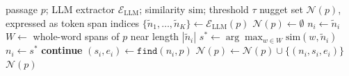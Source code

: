 \begin{algorithm}[htbp]
\caption{Nugget extraction pipeline.}
\label{alg:nugget}
\footnotesize
\begin{algorithmic}[1]
\Require passage $p$; LLM extractor $\mathcal{E}_{\text{LLM}}$; similarity $\mathrm{sim}$; threshold $\tau$
\Ensure nugget set $\mathcal{N}(p)$, expressed as token span indices
\State $\{\tilde{n}_1, \ldots, \tilde{n}_K\} \leftarrow \mathcal{E}_{\text{LLM}}(p)$ 
\State $\mathcal{N}(p) \leftarrow \emptyset$
   
    \State $n_i \leftarrow \tilde{n}_i$
  \Else {}
    \State $W \leftarrow$ whole-word spans of $p$ near length $|\tilde{n}_i|$
    \State $s^{\ast} \leftarrow \arg\max_{w \in W} \mathrm{sim}(w, \tilde{n}_i)$
      \State $n_i \leftarrow s^{\ast}$
    \Else
      \State \textbf{continue} 
    \EndIf
  \EndIf
  \State $(s_i, e_i) \leftarrow \texttt{find}(n_i, p)$ 
  \State $\mathcal{N}(p) \leftarrow \mathcal{N}(p) \cup \{ (n_i, s_i, e_i) \}$
\EndFor
\State \Return $\mathcal{N}(p)$
\end{algorithmic}
\end{algorithm}
